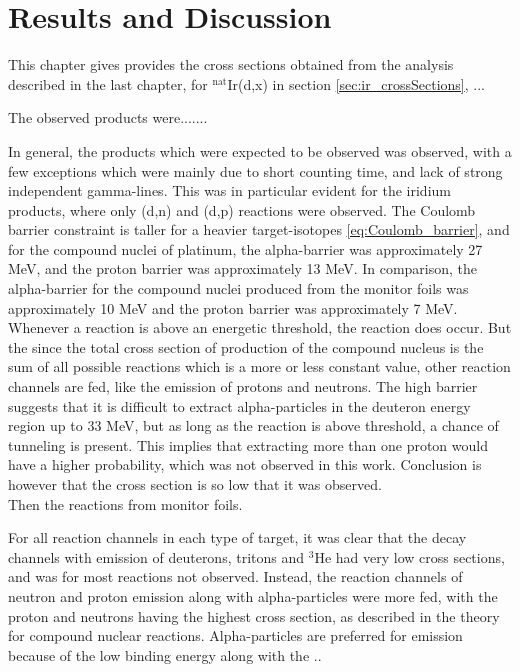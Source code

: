 \chapter{Results and Discussion}
This chapter gives provides the cross sections obtained from the analysis described in the last chapter, for $^\text{nat}$Ir(d,x) in section \ref{sec:ir_crossSections}, ... 

The observed products were....... 


In general, the products which were expected to be observed was observed, with a few exceptions which were mainly due to short counting time, and lack of strong independent gamma-lines. This was in particular evident for the iridium products, where only (d,n) and (d,p) reactions were observed. The Coulomb barrier constraint is taller for a heavier target-isotopes \ref{eq:Coulomb_barrier}, and for the compound nuclei of platinum, the alpha-barrier was approximately 27 MeV, and the proton barrier was approximately 13 MeV. In comparison, the alpha-barrier for the compound nuclei produced from the monitor foils was approximately 10 MeV and the proton barrier was approximately 7 MeV. Whenever a reaction is above an energetic threshold, the reaction does occur. But the since the total cross section of production of the compound nucleus is the sum of all possible reactions which is a more or less constant value, other reaction channels are fed, like the emission of protons and neutrons. The high barrier suggests that it is difficult to extract alpha-particles in the deuteron energy region up to 33 MeV, but as long as the reaction is above threshold, a chance of tunneling is present. This implies that extracting more than one proton would have a higher probability, which was not observed in this work. Conclusion is however that the cross section is so low that it was observed. \\


Then the reactions from monitor foils. 


For all reaction channels in each type of target, it was clear that the decay channels with emission of deuterons, tritons and $^3$He had very low cross sections, and was for most reactions not observed. Instead, the reaction channels of neutron and proton emission along with alpha-particles were more fed, with the proton and neutrons having the highest cross section, as described in the theory for compound nuclear reactions. Alpha-particles are preferred for emission because of the low binding energy along with the ..


